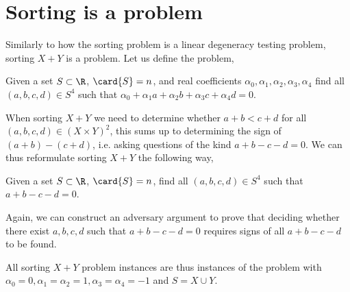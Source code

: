 \section{Sorting \XY is a \fourLDT problem}

Similarly to how the sorting problem is a linear degeneracy testing problem,
sorting $X+Y$ is a \fourLDT problem. Let us define the \fourLDT problem,

\begin{problem}
Given a set $S \subset \R$, $\card{S} = n$, and real coefficients $\alpha_0,
\alpha_1, \alpha_2, \alpha_3, \alpha_4$ find all $(a,b,c,d) \in S^4$ such that
$\alpha_0 + \alpha_1 a + \alpha_2 b + \alpha_3 c + \alpha_4 d = 0$.
\end{problem}

When sorting $X+Y$ we need to determine whether $a + b < c + d$ for all
$(a,b,c,d) \in (X \times Y)^2$, this sums up to determining the sign of $(a+b) -
(c+d)$, i.e. asking questions of the kind $a + b - c - d = 0$. We can thus
reformulate sorting $X+Y$ the following way,

\begin{problem}
Given a set $S \subset \R$, $\card{S} = n$, find all $(a,b,c,d) \in S^4$ such
that $a + b - c - d = 0$.
\end{problem}

Again, we can construct an adversary argument to prove that deciding whether
there exist \(a,b,c,d\) such that \(a+b-c-d=0\) requires signs of all
\(a+b-c-d\) to be found.

All sorting $X+Y$ problem instances are thus instances of the \fourLDT problem
with $\alpha_0 = 0, \alpha_1 = \alpha_2 = 1, \alpha_3 = \alpha_4 = -1$ and
$S = X \cup Y$.

